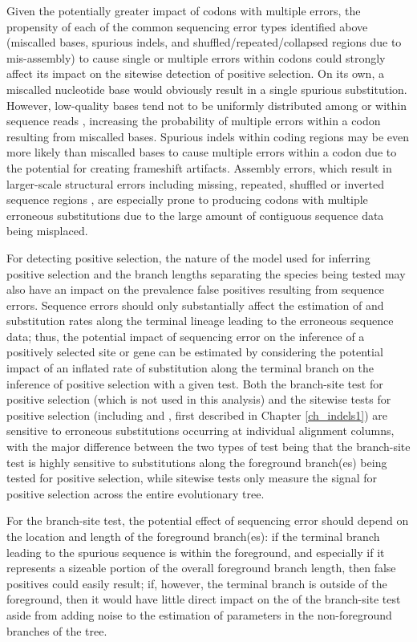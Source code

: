 Given the potentially greater impact of codons with multiple errors,
the propensity of each of the common sequencing error types identified
above (miscalled bases, spurious indels, and
shuffled/repeated/collapsed regions due to mis-assembly) to cause
single or multiple errors within codons could strongly affect its
impact on the sitewise detection of positive selection. On its own, a
miscalled nucleotide base would obviously result in a single spurious
substitution. However, low-quality bases tend not to be uniformly
distributed among or within sequence reads \citep{Kircher2009},
increasing the probability of multiple errors within a codon resulting
from miscalled bases. Spurious indels within coding regions may be
even more likely than miscalled bases to cause multiple errors within
a codon due to the potential for creating frameshift
artifacts. Assembly errors, which result in larger-scale structural
errors including missing, repeated, shuffled or inverted sequence
regions \citep{Jaffe2003}, are especially prone to producing codons
with multiple erroneous substitutions due to the large amount of
contiguous sequence data being misplaced.

For detecting positive selection, the nature of the model used for
inferring positive selection and the branch lengths separating the
species being tested may also have an impact on the prevalence false
positives resulting from sequence errors. Sequence errors should only
substantially affect the estimation of \nsyn and \syn substitution
rates along the terminal lineage leading to the erroneous sequence
data; thus, the potential impact of sequencing error on the inference
of a positively selected site or gene can be estimated by considering
the potential impact of an inflated rate of \nsyn substitution along
the terminal branch on the inference of positive selection with a
given test. Both the branch-site test for positive selection (which is
not used in this analysis) and the sitewise tests for positive
selection (including \pamlEight and \slr, first described in Chapter
\ref{ch_indels1}) are sensitive to erroneous substitutions occurring
at individual alignment columns, with the major difference between the
two types of test being that the branch-site test is highly sensitive
to substitutions along the foreground branch(es) being tested for
positive selection, while sitewise tests only measure the signal for
positive selection across the entire evolutionary tree.

For the branch-site test, the potential effect of sequencing error
should depend on the location and length of the foreground branch(es):
if the terminal branch leading to the spurious sequence is within the
foreground, and especially if it represents a sizeable portion of the
overall foreground branch length, then false positives could easily
result; if, however, the terminal branch is outside of the foreground,
then it would have little direct impact on the \fpr of the branch-site
test aside from adding noise to the estimation of parameters in the
non-foreground branches of the tree.

